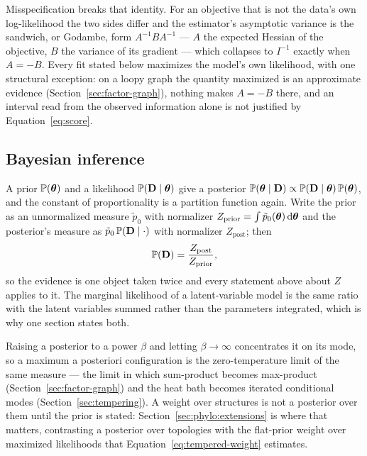 \documentclass[11pt,a4paper]{article}
\begin{document}
Misspecification breaks that identity. For an objective that is not the data's
own log-likelihood the two sides differ and the estimator's asymptotic variance
is the sandwich, or Godambe, form $A^{-1} B A^{-1}$ --- $A$ the expected
Hessian of the objective, $B$ the variance of its gradient --- which collapses
to $I^{-1}$ exactly when $A = -B$. Every fit stated below maximizes the model's
own likelihood, with one structural exception: on a loopy graph the quantity
maximized is an approximate evidence (Section~\ref{sec:factor-graph}), nothing
makes $A = -B$ there, and an interval read from the observed information alone
is not justified by Equation~\ref{eq:score}.

\subsection{Bayesian inference}

A prior $\mathbb{P}(\boldsymbol{\theta})$ and a likelihood $\mathbb{P}(\mathbf{D} \mid \boldsymbol{\theta})$ give a
posterior $\mathbb{P}(\boldsymbol{\theta} \mid \mathbf{D}) \propto \mathbb{P}(\mathbf{D} \mid \boldsymbol{\theta})\,
\mathbb{P}(\boldsymbol{\theta})$, and the constant of proportionality is a partition function
again. Write the prior as an unnormalized measure $\tilde{p}_0$ with normalizer
$Z_{\mathrm{prior}} = \int \tilde{p}_0(\boldsymbol{\theta})\, \mathrm{d}\boldsymbol{\theta}$ and the
posterior's measure as $\tilde{p}_0\, \mathbb{P}(\mathbf{D} \mid \cdot)$ with normalizer
$Z_{\mathrm{post}}$; then
\begin{equation}
  \mathbb{P}(\mathbf{D}) = \frac{Z_{\mathrm{post}}}{Z_{\mathrm{prior}}},
  \label{eq:evidence-ratio}
\end{equation}
so the evidence is one object taken twice and every statement above about $Z$
applies to it. The marginal likelihood of a latent-variable model is the same
ratio with the latent variables summed rather than the parameters integrated,
which is why one section states both.

Raising a posterior to a power $\beta$ and letting $\beta \to \infty$
concentrates it on its mode, so a maximum a posteriori configuration is the
zero-temperature limit of the same measure --- the limit in which sum-product
becomes max-product (Section~\ref{sec:factor-graph}) and the heat bath becomes
iterated conditional modes (Section~\ref{sec:tempering}). A weight over
structures is not a posterior over them until the prior is stated:
Section~\ref{sec:phylo:extensions} is where that matters, contrasting a
posterior over topologies with the flat-prior weight over maximized likelihoods
that Equation~\ref{eq:tempered-weight} estimates.
\end{document}

